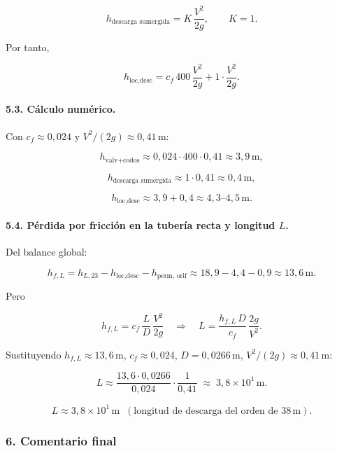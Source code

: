 \documentclass[12pt, a4paper]{article}
\begin{document}
\[
h_{\text{descarga sumergida}} = K\,\frac{V^2}{2g},
\qquad K = 1.
\]

Por tanto,

\[
h_{\text{loc,desc}}
= c_f\,400\,\frac{V^2}{2g} + 1\cdot \frac{V^2}{2g}.
\]

\paragraph{5.3. Cálculo numérico.}

Con $c_f \approx 0{,}024$ y $V^2/(2g)\approx 0{,}41\,\text{m}$:

\[
h_{\text{valv+codos}}
\approx 0{,}024\cdot 400\cdot 0{,}41
\approx 3{,}9\,\text{m},
\]

\[
h_{\text{descarga sumergida}} \approx 1\cdot 0{,}41 \approx 0{,}4\,\text{m},
\]

\[
h_{\text{loc,desc}} \approx 3{,}9 + 0{,}4 \approx 4{,}3\text{--}4{,}5\,\text{m}.
\]

\paragraph{5.4. Pérdida por fricción en la tubería recta y longitud $L$.}

Del balance global:

\[
h_{f,L}
= h_{L,23} - h_{\text{loc,desc}} - h_{\text{perm, orif}}
\approx 18{,}9 - 4{,}4 - 0{,}9
\approx 13{,}6\,\text{m}.
\]

Pero

\[
h_{f,L} = c_f\,\frac{L}{D}\,\frac{V^2}{2g}
\quad\Rightarrow\quad
L = \frac{h_{f,L}\,D}{c_f}\,\frac{2g}{V^2}.
\]

Sustituyendo $h_{f,L}\approx 13{,}6\,\text{m}$,
$c_f \approx 0{,}024$, $D = 0{,}0266\,\text{m}$,
$V^2/(2g)\approx 0{,}41\,\text{m}$:

\[
L \approx
\frac{13{,}6\cdot 0{,}0266}{0{,}024}\cdot
\frac{1}{0{,}41}
\;\approx\; 3{,}8\times 10^{1}\,\text{m}.
\]

\[
\boxed{L \approx 3{,}8\times 10^{1}\,\text{m}
      \;\; (\text{longitud de descarga del orden de } 38\,\text{m}).}
\]

\subsubsection*{6. Comentario final}
\end{document}

